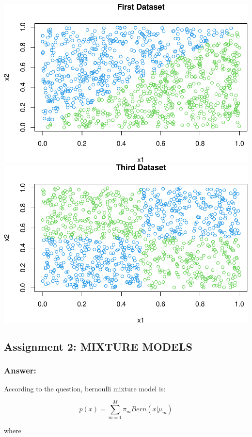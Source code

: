 \documentclass[
]{article}
\begin{document}
\includegraphics{Lab1Block2_files/figure-latex/1.7-1.pdf}
\includegraphics{Lab1Block2_files/figure-latex/1.7-2.pdf}

\hypertarget{assignment-2-mixture-models}{%
\subsection{Assignment 2: MIXTURE
MODELS}\label{assignment-2-mixture-models}}

\hypertarget{answer-1}{%
\subsubsection{Answer:}\label{answer-1}}

According to the question, bernoulli mixture model is:

\[
p(x) = \sum_{m=1}^{M}\pi_{m}  Bern(x|\mu_{m})
\]

where
\end{document}
